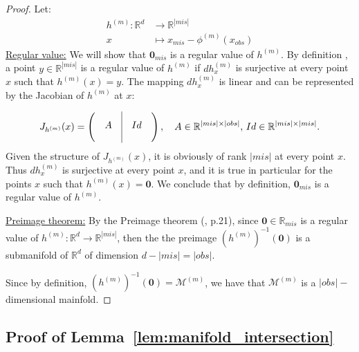\documentclass{article}
\newcommand{\RR}{\mathbb{R}}
\newcommand{\Mcal}{\mathcal{M}}
\newcommand{\br}[1]{\left(#1\right)}
\theoremstyle{plain}
\begin{document}
\begin{proof}
    Let:
    \begin{align*}
        h^{(m)}: \RR^d & \to \RR^{|mis|}\\
        x & \mapsto x_{mis} - \phi^{(m)}(x_{obs})
    \end{align*}
    \underline{Regular value:} We will show that $\bm 0_{mis}$ is a regular value of $h^{(m)}$. By definition \citep[see p21 in][]{GP_book}, a point $y \in \RR^{|mis|}$ is a regular value of $h^{(m)}$ if $dh^{(m)}_x$ is surjective at every point $x$ such that $h^{(m)}(x) = y$. The mapping $dh^{(m)}_x$ is linear and can be represented by the Jacobian of $h^{(m)}$ at $x$:
    
    \newcommand{\BigA}{\vrule width 0pt height 17pt depth 15pt A}
    \begin{equation*}
        J_{h^{(m)}}(x) =
            \left(
                \begin{matrix} & \BigA & \vline & Id & \end{matrix}
            \right), \quad
            A \in \RR^{|mis|\times|obs|},\, Id \in \RR^{|mis|\times|mis|}.
    \end{equation*}
    Given the structure of $J_{h^{(m)}}(x)$, it is obviously of rank $|mis|$ at every point $x$. Thus $dh^{(m)}_x$ is surjective at every point $x$, and it is true in particular for the points $x$ such that $h^{(m)}(x) = \bm 0$. We conclude that by definition, $\bm 0_{mis}$ is a regular value of $h^{(m)}$.
    
    \underline{Preimage theorem:} By the Preimage theorem (\citep{GP_book}, p.21), since $\bm 0 \in \RR_{mis}$ is a regular value of $h^{(m)}: \RR^d \to \RR^{|mis|}$, then the the preimage $\br{h^{(m)}}^{-1}(\bm 0)$ is a submanifold of $\RR^d$ of dimension $d - |mis| = |obs|$.
    
    Since by definition, $\br{h^{(m)}}^{-1}(\bm 0) = \Mcal^{(m)}$, we have that $\Mcal^{(m)}$ is a $|obs|-$dimensional mainfold.
\end{proof}



\subsection{Proof of Lemma~\ref{lem:manifold_intersection}}
\end{document}
